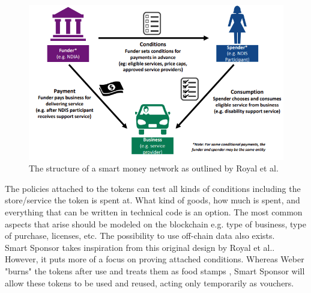 \begin{figure}[H]
    \centering
    \includegraphics[scale=0.7]{figures/smart_money_network.PNG}  
    \caption{The structure of a smart money network as outlined by Royal et al.\cite{royal}}
    \label{fig:smart_network}
\end{figure}
The policies attached to the tokens can test all kinds of conditions including the store/service the token is spent at. What kind of goods, how much is spent, and everything that can be written in technical code is an option. The most common aspects that arise should be modeled on the blockchain e.g. type of business, type of purchase, licenses, etc. The possibility to use off-chain data also exists.\\
Smart Sponsor takes inspiration from this original design by Royal et al.\cite{royal}. However, it puts more of a focus on proving attached conditions. Whereas Weber "burns" the tokens after use and treats them as food stamps \cite{weber}\cite{pattern}, Smart Sponsor will allow these tokens to be used and reused, acting only temporarily as vouchers.